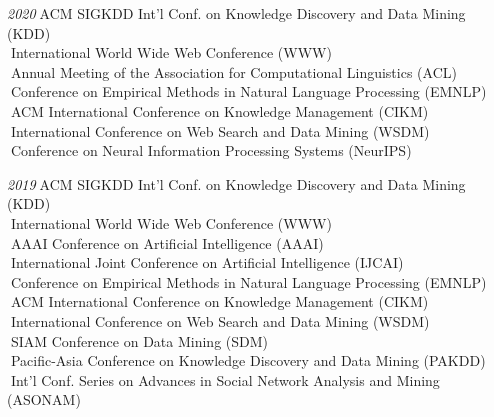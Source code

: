 \documentclass[10pt]{article}
\newenvironment{myindentpar}[1]%
{\begin{list}{}%
         {\setlength{\leftmargin}{#1}}%
         \item[]%
}
{\end{list}}
\newcounter{list}
\begin{document}
\begin{myindentpar}{0.75cm}
{\hspace{-0.75cm}\textit{2020}\textcolor{white}{.}ACM SIGKDD Int'l Conf. on Knowledge Discovery and Data Mining (KDD) \\
\textcolor{white}{.}International World Wide Web Conference (WWW) \\
\textcolor{white}{.}Annual Meeting of the Association for Computational Linguistics (ACL) \\
\textcolor{white}{.}Conference on Empirical Methods in Natural Language Processing (EMNLP) \\
\textcolor{white}{.}ACM International Conference on Knowledge Management (CIKM) \\
\textcolor{white}{.}International Conference on Web Search and Data Mining (WSDM) \\
\textcolor{white}{.}Conference on Neural Information Processing Systems (NeurIPS)

\hspace{-0.75cm}\textit{2019}\textcolor{white}{.}ACM SIGKDD Int'l Conf. on Knowledge Discovery and Data Mining (KDD) \\
\textcolor{white}{.}International World Wide Web Conference (WWW) \\
\textcolor{white}{.}AAAI Conference on Artificial Intelligence (AAAI) \\
\textcolor{white}{.}International Joint Conference on Artificial Intelligence (IJCAI) \\
\textcolor{white}{.}Conference on Empirical Methods in Natural Language Processing (EMNLP) \\
\textcolor{white}{.}ACM International Conference on Knowledge Management (CIKM) \\
\textcolor{white}{.}International Conference on Web Search and Data Mining (WSDM) \\
\textcolor{white}{.}SIAM Conference on Data Mining (SDM) \\
\textcolor{white}{.}Pacific-Asia Conference on Knowledge Discovery and Data Mining (PAKDD) \\
\textcolor{white}{.}Int'l Conf. Series on Advances in Social Network Analysis and Mining (ASONAM)
	
}
\end{myindentpar}
\end{document}
